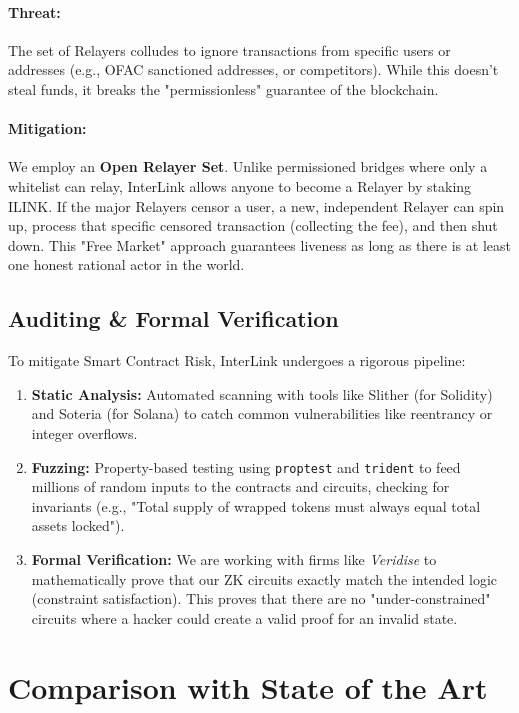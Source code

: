 \documentclass[11pt,a4paper]{article}
\begin{document}
\paragraph{Threat:} 
The set of Relayers colludes to ignore transactions from specific users or addresses (e.g., OFAC sanctioned addresses, or competitors). While this doesn't steal funds, it breaks the "permissionless" guarantee of the blockchain.

\paragraph{Mitigation:} 
We employ an \textbf{Open Relayer Set}. Unlike permissioned bridges where only a whitelist can relay, InterLink allows anyone to become a Relayer by staking ILINK. If the major Relayers censor a user, a new, independent Relayer can spin up, process that specific censored transaction (collecting the fee), and then shut down. This "Free Market" approach guarantees liveness as long as there is at least one honest rational actor in the world.

\subsection{Auditing \& Formal Verification}
To mitigate Smart Contract Risk, InterLink undergoes a rigorous pipeline:
\begin{enumerate}
    \item \textbf{Static Analysis:} Automated scanning with tools like Slither (for Solidity) and Soteria (for Solana) to catch common vulnerabilities like reentrancy or integer overflows.
    \item \textbf{Fuzzing:} Property-based testing using \texttt{proptest} and \texttt{trident} to feed millions of random inputs to the contracts and circuits, checking for invariants (e.g., "Total supply of wrapped tokens must always equal total assets locked").
    \item \textbf{Formal Verification:} We are working with firms like \textit{Veridise} to mathematically prove that our ZK circuits exactly match the intended logic (constraint satisfaction). This proves that there are no "under-constrained" circuits where a hacker could create a valid proof for an invalid state.
\end{enumerate}

\section{Comparison with State of the Art}
\label{sec:compare}
\end{document}
